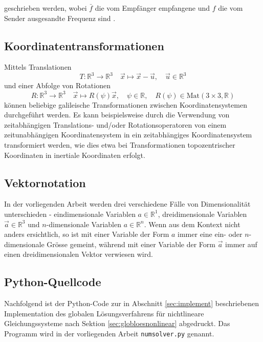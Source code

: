 \documentclass[a4paper,12pt]{article}
\numberwithin{equation}{section}
\begin{document}
 geschrieben werden, wobei $\bar{f}$ die vom Empfänger empfangene und $f$ die vom Sender ausgesandte Frequenz sind \cite[S.474-475]{Tipler.2015}.

\subsection{Koordinatentransformationen}
Mittels Translationen \begin{equation} T: \mathbb{R}^3 \rightarrow \mathbb{R}^3\quad \vec{x}\mapsto\vec{x}-\vec{u},\quad \vec{u}\in \mathbb{R}^3 \end{equation} und einer Abfolge von Rotationen \begin{equation} R: \mathbb{R}^3 \rightarrow \mathbb{R}^3\quad \vec{x}\mapsto R(\psi)\vec{x},\quad \psi \in \mathbb{R},\quad R(\psi) \in \text{Mat}(3\times 3, \mathbb{R}) \end{equation} können beliebige galileische Transformationen zwischen Koordinatensystemen durchgeführt werden. Es kann beispielsweise durch die Verwendung von zeitabhängigen Translations- und/oder Rotationsoperatoren von einem zeitunabhängigen Koordinatensystem in ein zeitabhängiges Koordinatensystem transformiert werden, wie dies etwa bei Transformationen topozentrischer Koordinaten in inertiale Koordinaten erfolgt.

\subsection{Vektornotation}
In der vorliegenden Arbeit werden drei verschiedene Fälle von Dimensionalität unterschieden - eindimensionale Variablen $a \in \mathbb{R}^1$, dreidimensionale Variablen $\vec{a} \in \mathbb{R}^3$ und $n$-dimensionale Variablen $a \in \mathbb{R}^n$. Wenn aus dem Kontext nicht anders ersichtlich, so ist mit einer Variable der Form $a$ immer eine ein- oder $n$-dimensionale Grösse gemeint, während mit einer Variable der Form $\vec{a}$ immer auf einen dreidimensionalen Vektor verwiesen wird.

\subsection{Python-Quellcode}\label{sec:pythoncode}
Nachfolgend ist der Python-Code zur in Abschnitt \ref{sec:implement} beschriebenen Implementation des globalen Lösungsverfahrens für nichtlineare Gleichungssysteme nach Sektion \ref{sec:globloesnonlinear} abgedruckt. Das Programm wird in der vorliegenden Arbeit \verb|numsolver.py| genannt.
\end{document}
